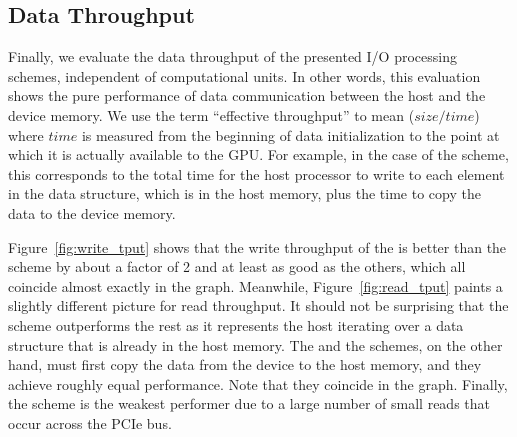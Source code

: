 \subsection{Data Throughput}
\label{sec:data_throughput}

Finally, we evaluate the data throughput of the presented I/O processing
schemes, independent of computational units.
In other words, this evaluation shows the pure performance of data
communication between the host and the device memory.
We use the term ``effective throughput'' to mean ($size/time$) where
$time$ is measured from the beginning of data initialization to the
point at which it is actually available to the GPU.
For example, in the case of the {\hd} scheme, this corresponds to the
total time for the host processor to write to each element in the data
structure, which is in the host memory, plus the time to copy the data
to the device memory.

Figure~\ref{fig:write_tput} shows that the write throughput of the
{\dmh} is better than the {\hd} scheme by about a factor of 2 and at
least as good as the others, which all coincide almost exactly in the
graph.
Meanwhile, Figure~\ref{fig:read_tput} paints a slightly different
picture for read throughput.
It should not be surprising that the {\hp} scheme outperforms the rest
as it represents the host iterating over a data structure that is
already in the host memory.
The {\hd} and the {\dmh} schemes, on the other hand, must first copy the
data from the device to the host memory, and they achieve roughly equal
performance.
Note that they coincide in the graph.
Finally, the {\dm} scheme is the weakest performer due to a large
number of small reads that occur across the PCIe bus.

